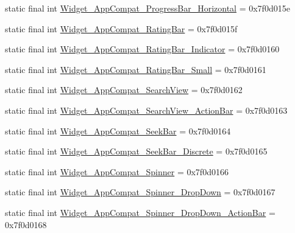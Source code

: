 \begin{DoxyCompactItemize}
static final int \mbox{\hyperlink{classandroid_1_1support_1_1design_1_1_r_1_1style_aa2e12a70a393c57a17d369b1e609d364}{Widget\+\_\+\+App\+Compat\+\_\+\+Progress\+Bar\+\_\+\+Horizontal}} = 0x7f0d015e
\item 
static final int \mbox{\hyperlink{classandroid_1_1support_1_1design_1_1_r_1_1style_a5040616cea8d7da82220110548051e50}{Widget\+\_\+\+App\+Compat\+\_\+\+Rating\+Bar}} = 0x7f0d015f
\item 
static final int \mbox{\hyperlink{classandroid_1_1support_1_1design_1_1_r_1_1style_a9a623e13544be7d8bed9790bc60d7d26}{Widget\+\_\+\+App\+Compat\+\_\+\+Rating\+Bar\+\_\+\+Indicator}} = 0x7f0d0160
\item 
static final int \mbox{\hyperlink{classandroid_1_1support_1_1design_1_1_r_1_1style_a0b118a854e0340226bcc8e52777c1d2f}{Widget\+\_\+\+App\+Compat\+\_\+\+Rating\+Bar\+\_\+\+Small}} = 0x7f0d0161
\item 
static final int \mbox{\hyperlink{classandroid_1_1support_1_1design_1_1_r_1_1style_af6d560de565321d15b4a69965fafa406}{Widget\+\_\+\+App\+Compat\+\_\+\+Search\+View}} = 0x7f0d0162
\item 
static final int \mbox{\hyperlink{classandroid_1_1support_1_1design_1_1_r_1_1style_a2aa0a46a64702cbdf9aaa8e3429ab0ec}{Widget\+\_\+\+App\+Compat\+\_\+\+Search\+View\+\_\+\+Action\+Bar}} = 0x7f0d0163
\item 
static final int \mbox{\hyperlink{classandroid_1_1support_1_1design_1_1_r_1_1style_ae54f68dd3e90f4e8ff9136275712c095}{Widget\+\_\+\+App\+Compat\+\_\+\+Seek\+Bar}} = 0x7f0d0164
\item 
static final int \mbox{\hyperlink{classandroid_1_1support_1_1design_1_1_r_1_1style_afc2e13a950726a10343b942eb0c881f9}{Widget\+\_\+\+App\+Compat\+\_\+\+Seek\+Bar\+\_\+\+Discrete}} = 0x7f0d0165
\item 
static final int \mbox{\hyperlink{classandroid_1_1support_1_1design_1_1_r_1_1style_a4789d9d51f1b1f6f79df9813c334b06c}{Widget\+\_\+\+App\+Compat\+\_\+\+Spinner}} = 0x7f0d0166
\item 
static final int \mbox{\hyperlink{classandroid_1_1support_1_1design_1_1_r_1_1style_a9bff6276c861e1b86ed15d178ebb319f}{Widget\+\_\+\+App\+Compat\+\_\+\+Spinner\+\_\+\+Drop\+Down}} = 0x7f0d0167
\item 
static final int \mbox{\hyperlink{classandroid_1_1support_1_1design_1_1_r_1_1style_ac9a5e8337a2d3ae56a72aff0816041ee}{Widget\+\_\+\+App\+Compat\+\_\+\+Spinner\+\_\+\+Drop\+Down\+\_\+\+Action\+Bar}} = 0x7f0d0168
\item 

\end{DoxyCompactItemize}
